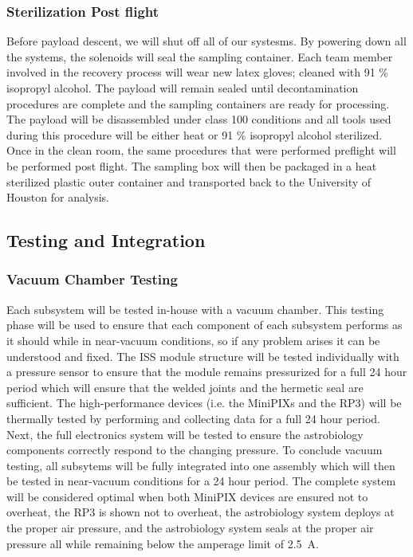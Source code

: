 \subsubsection{Sterilization Post flight}
Before payload descent, we will shut off all of our systesms. By powering down all the systems, the solenoids will seal the sampling container. Each team member involved in the recovery process will wear new latex gloves; cleaned with 91 \% isopropyl alcohol. The payload will remain sealed until decontamination procedures are complete and the sampling containers are ready for processing. The payload will be disassembled under class 100 conditions and all tools used during this procedure will be either heat or 91 \% isopropyl alcohol sterilized. Once in the clean room, the same procedures that were performed preflight will be performed post flight. The sampling box will then be packaged in a heat sterilized plastic outer container and transported back to the University of Houston for analysis.


\subsection{Testing and Integration}

\subsubsection{Vacuum Chamber Testing}
Each subsystem will be tested in-house with a vacuum chamber.
This testing phase will be used to ensure that each component of each subsystem performs as it should while in near-vacuum conditions, so if any problem arises it can be understood and fixed.
The ISS module structure will be tested individually with a pressure sensor to ensure that the module remains pressurized for a full \num{24} hour period which will ensure that the welded joints and the hermetic seal are sufficient.
The high-performance devices (i.e. the MiniPIXs and the RP3) will be thermally tested by performing and collecting data for a full \num{24} hour period.
Next, the full electronics system will be tested to ensure the astrobiology components correctly respond to the changing pressure.
To conclude vacuum testing, all subsytems will be fully integrated into one assembly which will then be tested in near-vacuum conditions for a \num{24} hour period.
The complete system will be considered optimal when both MiniPIX devices are ensured not to overheat, the RP3 is shown not to overheat, the astrobiology system deploys at the proper air pressure, and the astrobiology system seals at the proper air pressure all while remaining below the amperage limit of \SI{2.5}{\ampere}.

